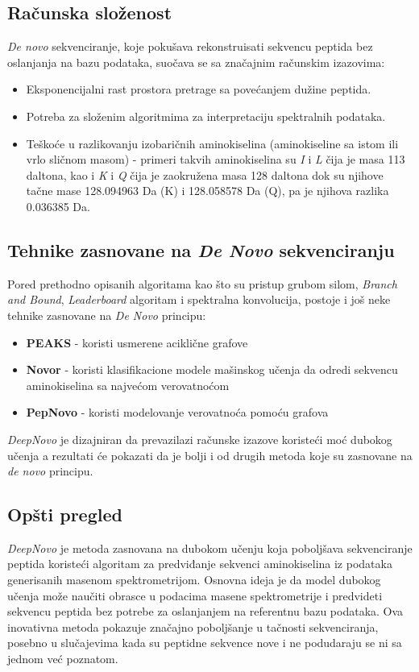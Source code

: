 \documentclass[12pt,oneside]{memoir}
\begin{document}
\subsection{Računska složenost}
\emph{De novo} sekvenciranje, koje pokušava rekonstruisati sekvencu peptida bez oslanjanja na bazu podataka, suočava se sa značajnim računskim izazovima:

\begin{itemize}
\item Eksponencijalni rast prostora pretrage sa povećanjem dužine peptida.
\item Potreba za složenim algoritmima za interpretaciju spektralnih podataka.
\item Teškoće u razlikovanju izobaričnih aminokiselina (aminokiseline sa istom ili vrlo sličnom masom) - primeri takvih aminokiselina su \textit{I} i \textit{L} čija je masa 113 daltona, kao i \textit{K} i \textit{Q} čija je zaokružena masa 128 daltona dok su njihove tačne mase 128.094963 Da (K) i 128.058578 Da (Q), pa je njihova razlika 0.036385 Da. 
\end{itemize}

\subsection{Tehnike zasnovane na \emph{De Novo} sekvenciranju}
Pored prethodno opisanih algoritama kao što su pristup grubom silom, \emph{Branch and Bound}, \emph{Leaderboard} algoritam i spektralna konvolucija, postoje i još neke tehnike zasnovane na \emph{De Novo} principu:

\begin{itemize}
\item \textbf{PEAKS} \cite{peaks} - koristi usmerene aciklične grafove
\item \textbf{Novor} \cite{novor} - koristi klasifikacione modele mašinskog učenja da odredi sekvencu aminokiselina sa najvećom verovatnoćom
\item \textbf{PepNovo} \cite{pepnovo} - koristi modelovanje verovatnoća pomoću grafova
\end{itemize}

\emph{DeepNovo} je dizajniran da prevazilazi računske izazove koristeći moć dubokog učenja a rezultati će pokazati da je bolji i od drugih metoda koje su zasnovane na \emph{de novo} principu.

\subsection{Opšti pregled}
\emph{DeepNovo} \cite{deepnovo} je metoda zasnovana na dubokom učenju koja poboljšava sekvenciranje peptida koristeći algoritam za predviđanje sekvenci aminokiselina iz podataka generisanih masenom spektrometrijom. Osnovna ideja je da model dubokog učenja može naučiti obrasce u podacima masene spektrometrije i predvideti sekvencu peptida bez potrebe za oslanjanjem na referentnu bazu podataka. Ova inovativna metoda pokazuje značajno poboljšanje u tačnosti sekvenciranja, posebno u slučajevima kada su peptidne sekvence nove i ne podudaraju se ni sa jednom već poznatom.
\end{document}
